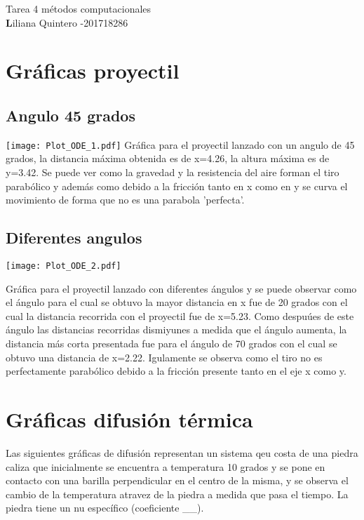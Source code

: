 \documentclass[a4paper,11pt]{article}
\begin{document}
\begin{center}
{\Large Tarea 4 m\'etodos computacionales} \\
{\textbf Liliana Quintero -201718286}
\end{center}


\noindent
\section{Gr\'aficas proyectil}

\subsection{Angulo 45 grados}

\begin{center}
\texttt{[image: Plot\_ODE\_1.pdf]} 
Gr\'afica para el proyectil lanzado con un angulo de 45 grados, la distancia m\'axima obtenida es de x=4.26, la altura m\'axima es de y=3.42. Se puede ver como la gravedad y la resistencia del aire forman el tiro parab\'olico y adem\'as como debido a la fricci\'on tanto en x como en y se curva el movimiento de forma que no es una parabola 'perfecta'.
\end{center}

\subsection{Diferentes angulos}

\begin{center}
\texttt{[image: Plot\_ODE\_2.pdf]}
\end{center}
Gr\'afica para el proyectil lanzado con diferentes \'angulos y se puede observar como el \'angulo para el cual se obtuvo la mayor distancia en x fue de 20 grados con el cual la distancia recorrida con el proyectil fue de x=5.23. Como despu\'ues de este \'angulo las distancias recorridas dismiyunes a medida que el \'angulo aumenta, la distancia m\'as corta presentada fue para el \'angulo de 70 grados con el cual se obtuvo una distancia de x=2.22.  Igulamente se observa como el tiro no es perfectamente parab\'olico debido a la fricci\'on presente tanto en el eje x como y.

\section{Gr\'aficas difusi\'on t\'ermica}

Las siguientes gr\'aficas de difusi\'on representan un sistema qeu costa de una piedra caliza que inicialmente se encuentra a temperatura 10 grados y se pone en contacto con una barilla perpendicular en el centro de la misma, y se observa el cambio de la temperatura atravez de la piedra a medida que pasa el tiempo. La piedra tiene un nu espec\'ifico (coeficiente __).
\end{document}

